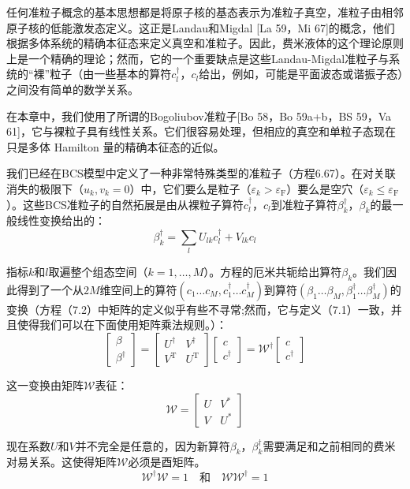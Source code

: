 任何准粒子概念的基本思想都是将原子核的基态表示为准粒子真空，准粒子由相邻原子核的低能激发态定义。这正是Landau和Migdal {[}La
59，Mi 67{]}的概念，他们根据多体系统的精确本征态来定义真空和准粒子。因此，费米液体的这个理论原则上是一个精确的理论；然而，它的一个重要缺点是这些Landau-Migdal准粒子与系统的“裸”粒子（由一些基本的算符$c^{\dagger}_{l}$，$c_{l}$给出，例如，可能是平面波态或谐振子态）之间没有简单的数学关系。

在本章中，我们使用了所谓的Bogoliubov准粒子{[}Bo 58，Bo 59a+b，BS 59，Va 61{]}，它与裸粒子具有线性关系。它们很容易处理，但相应的真空和单粒子态现在只是多体
Hamilton 量的精确本征态的近似。

我们已经在BCS模型中定义了一种非常特殊类型的准粒子（方程6.67）。在对关联消失的极限下（$u_{k},v_{k}=0$）中，它们要么是粒子（$\varepsilon_{k}>\varepsilon_{\text{F}}$）要么是空穴（$\varepsilon_{k}\leq\varepsilon_{\text{F}}$）。这些BCS准粒子的自然拓展是由从裸粒子算符$c^{\dagger}_{l}$，$c_{l}$到准粒子算符$\beta^{\dagger}_{k}$，$\beta_{k}$的最一般线性变换给出的：
\[
\beta^{\dagger}_{k}=\sum_{l}U_{lk}c^{\dagger}_{l}+V_{lk}c_{l}
\]

指标$k$和$l$取遍整个组态空间（$k=1,\dots,M$）。方程的厄米共轭给出算符$\beta_{k}$。我们因此得到了一个从$2M$维空间上的算符$(c_{1}\dots c_{M},c^{\dagger}_{1}\dots c^{\dagger}_{M})$到算符$(\beta_{1}\dots\beta_{M},\beta^{\dagger}_{1}\dots\beta^{\dagger}_{M})$的变换（方程（7.2）中矩阵的定义似乎有些不寻常;然而，它与定义（7.1）一致，并且使得我们可以在下面使用矩阵乘法规则。）：
\[
\begin{bmatrix}\beta\\
\beta^{\dagger}
\end{bmatrix}=\begin{bmatrix}U^{\dagger} & V^{\dagger}\\
V^{\mathrm{T}} & U^{\mathrm{T}}
\end{bmatrix}\begin{bmatrix}c\\
c^{\dagger}
\end{bmatrix}=\mathcal{W}^{\dagger}\begin{bmatrix}c\\
c^{\dagger}
\end{bmatrix}
\]

这一变换由矩阵$\mathcal{W}$表征：
\[
\mathcal{W}=\begin{bmatrix}U & V^{*}\\
V & U^{*}
\end{bmatrix}
\]

现在系数$U$和$V$并不完全是任意的，因为新算符$\beta_{k}$，$\beta^{\dagger}_{k}$需要满足和之前相同的费米对易关系。这使得矩阵$\mathcal{W}$必须是酉矩阵。
\[
\mathcal{W}^{\dagger}\mathcal{W}=1\quad\text{和}\quad\mathcal{W}\mathcal{W}^{\dagger}=1
\]

